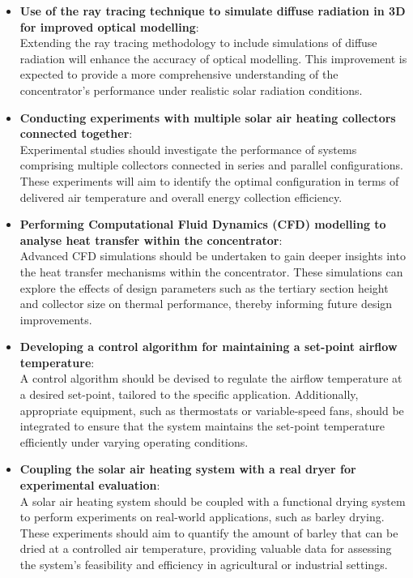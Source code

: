\begin{itemize}
	\item \textbf{Use of the ray tracing technique to simulate diffuse radiation in 3D for improved optical modelling}: \\
	Extending the ray tracing methodology to include simulations of diffuse radiation will enhance the accuracy of optical modelling. This improvement is expected to provide a more comprehensive understanding of the concentrator's performance under realistic solar radiation conditions.
	
	\item \textbf{Conducting experiments with multiple solar air heating collectors connected together}: \\
	Experimental studies should investigate the performance of systems comprising multiple collectors connected in series and parallel configurations. These experiments will aim to identify the optimal configuration in terms of delivered air temperature and overall energy collection efficiency.
	
	\item \textbf{Performing Computational Fluid Dynamics (CFD) modelling to analyse heat transfer within the concentrator}: \\
	Advanced CFD simulations should be undertaken to gain deeper insights into the heat transfer mechanisms within the concentrator. These simulations can explore the effects of design parameters such as the tertiary section height and collector size on thermal performance, thereby informing future design improvements.
	
	\item \textbf{Developing a control algorithm for maintaining a set-point airflow temperature}: \\
	A control algorithm should be devised to regulate the airflow temperature at a desired set-point, tailored to the specific application. Additionally, appropriate equipment, such as thermostats or variable-speed fans, should be integrated to ensure that the system maintains the set-point temperature efficiently under varying operating conditions.
	
	\item \textbf{Coupling the solar air heating system with a real dryer for experimental evaluation}: \\
	A solar air heating system should be coupled with a functional drying system to perform experiments on real-world applications, such as barley drying. These experiments should aim to quantify the amount of barley that can be dried at a controlled air temperature, providing valuable data for assessing the system's feasibility and efficiency in agricultural or industrial settings.
\end{itemize}




